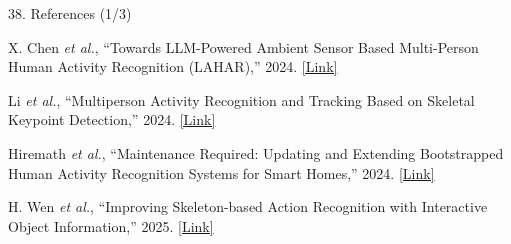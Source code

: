 \documentclass[aspectratio=169,11pt,xcolor=table]{beamer}
\begin{document}
\begin{frame}{38. References (1/3)}

\footnotesize
\color{black}
\raggedright

\begin{list}
    {}
    {
        \setlength{\leftmargin}{0.45cm}
        \setlength{\labelwidth}{0cm}
        \setlength{\labelsep}{0.10cm}
        \setlength{\itemsep}{8pt}
        \setlength{\parsep}{0pt}
        \setlength{\topsep}{0pt}
    }

\item[\textbf{[1]}]
X. Chen \emph{et al.}, ``Towards LLM-Powered Ambient Sensor Based
Multi-Person Human Activity Recognition (LAHAR),'' 2024.
\hspace{2pt}
\href{https://ieeexplore.ieee.org/document/10763542/}
{\textcolor{AmritaMaroon}{[Link]}}

\item[\textbf{[2]}]
Li \emph{et al.}, ``Multiperson Activity Recognition and Tracking
Based on Skeletal Keypoint Detection,'' 2024.
\hspace{2pt}
\href{https://www.researchgate.net/publication/374189243_Multiperson_Activity_Recognition_and_Tracking_Based_on_Skeletal_Keypoint_Detection}
{\textcolor{AmritaMaroon}{[Link]}}

\item[\textbf{[3]}]
Hiremath \emph{et al.}, ``Maintenance Required: Updating and Extending
Bootstrapped Human Activity Recognition Systems for Smart Homes,'' 2024.
\hspace{2pt}
\href{https://arxiv.org/pdf/2406.14446}
{\textcolor{AmritaMaroon}{[Link]}}

\item[\textbf{[4]}]
H. Wen \emph{et al.}, ``Improving Skeleton-based Action Recognition
with Interactive Object Information,'' 2025.
\hspace{2pt}
\href{https://arxiv.org/abs/2501.05066}
{\textcolor{AmritaMaroon}{[Link]}}

\end{list}

\end{frame}


\end{document}
